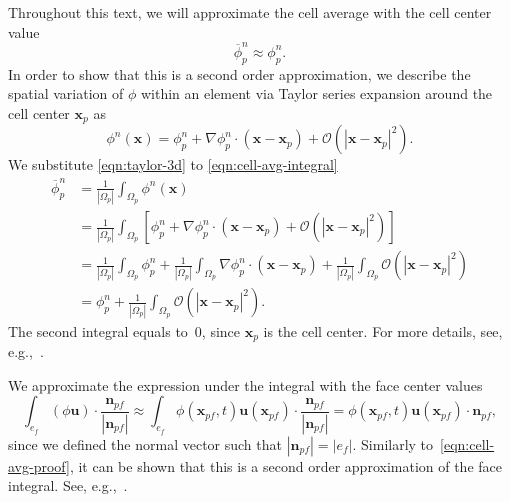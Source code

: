 \documentclass[../thesis.tex]{subfiles}
\begin{document}
Throughout this text, we will approximate the cell average with the cell
center value
\[
	\overline{\phi}_p^{n} \approx \phi_p^{n}.
\]
In order to show that this is a second order approximation,
we describe the spatial variation of \(\phi\) within an element
via Taylor series expansion around the cell center \(\mathbf{x}_p\) as
\begin{equation}\label{eqn:taylor-3d}
	\phi^n(\mathbf{x}) = \phi_p^{n}
	+ \nabla \phi_p^{n} \cdot \left( \mathbf{x} - \mathbf{x}_p \right)
	+ \mathcal{O}\left( |\mathbf{x} - \mathbf{x}_p|^2 \right).
\end{equation}
We substitute
\eqref{eqn:taylor-3d} to \eqref{eqn:cell-avg-integral}
\begin{equation}\label{eqn:cell-avg-proof}
	\begin{split}
		\overline{\phi}^{n}_p
		&= \frac{1}{|\Omega_p|}\int_{\Omega_p} \phi^{n}(\mathbf{x})\\
		&= \frac{1}{|\Omega_p|}\int_{\Omega_p} \left[ \phi_p^{n}
		+ \nabla \phi_p^{n} \cdot \left( \mathbf{x} - \mathbf{x}_p \right)
		+ \mathcal{O}\left( |\mathbf{x} - \mathbf{x}_p|^2 \right) \right]\\
		&= \frac{1}{|\Omega_p|}\int_{\Omega_p} \phi_p^{n}
		+ \frac{1}{|\Omega_p|}\int_{\Omega_p} \nabla \phi_p^{n} \cdot
		\left( \mathbf{x} - \mathbf{x}_p \right)
		+ \frac{1}{|\Omega_p|}\int_{\Omega_p} \mathcal{O}\left( |\mathbf{x} - \mathbf{x}_p|^2 \right)\\
		&= \phi_p^{n} + \frac{1}{|\Omega_p|}\int_{\Omega_p} \mathcal{O}\left( |\mathbf{x} - \mathbf{x}_p|^2 \right).
	\end{split}
\end{equation}
The second integral equals to~0, since \(\mathbf{x}_p\) is the cell center.
For more details, see, e.g.,~\cite{2016_Moukalled_BOOK,1996_Jasak}.

We approximate the expression under the integral
with the face center values
\[
	\int_{e_f}
	\left( \phi\mathbf{u} \right)\cdot
	\frac{\mathbf{n}_{pf}}{|\mathbf{n}_{pf}|}
	\approx
	\int_{e_f} \phi(\mathbf{x}_{pf},t) \mathbf{u}(\mathbf{x}_{pf}) \cdot
	\frac{\mathbf{n}_{pf}}{|\mathbf{n}_{pf}|}
	= \phi(\mathbf{x}_{pf},t) \mathbf{u}(\mathbf{x}_{pf}) \cdot \mathbf{n}_{pf},
\]
since we defined the normal vector such that \(|\mathbf{n}_{pf}| = |e_f|\).
Similarly to~\eqref{eqn:cell-avg-proof}, it can be shown
that this is a second order approximation of the face integral.
See, e.g.,~\cite{2016_Moukalled_BOOK,1996_Jasak}.
\end{document}
